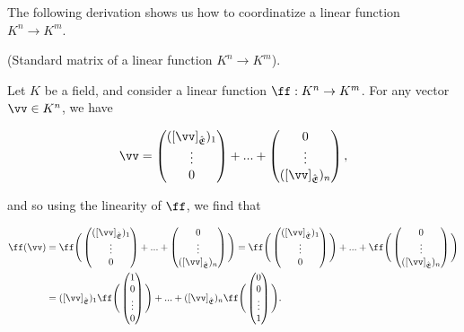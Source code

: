 The following derivation shows us how to coordinatize a linear function $K^n \rightarrow K^m$.

\begin{deriv}
\label{ch::lin_alg::deriv::standard_matrix}
    (Standard matrix of a linear function $K^n \rightarrow K^m$). 
    
    Let $K$ be a field, and consider a linear function $\ff:K^n \rightarrow K^m$. For any vector $\vv \in K^n$, we have 
    
    \begin{align*}
        \vv =
        \begin{pmatrix} ([\vv]_\sE)_1 \\ \vdots \\ 0 \end{pmatrix} + ... + \begin{pmatrix} 0 \\ \vdots \\ ([\vv]_\sE)_n \end{pmatrix},
    \end{align*}
    
    and so using the linearity of $\ff$, we find that
    
    \begin{align*}
        \ff(\vv) &= 
        \ff
        \Bigg(
            \begin{pmatrix} ([\vv]_\sE)_1 \\ \vdots \\ 0 \end{pmatrix} + ... + \begin{pmatrix} 0 \\ \vdots \\ ([\vv]_\sE)_n \end{pmatrix}
        \Bigg)
        =
        \ff \Bigg( 
        \begin{pmatrix} 
                ([\vv]_\sE)_1 \\ \vdots \\ 0 
        \end{pmatrix} \Bigg)
        +
        ...
        +
        \ff \Bigg(
        \begin{pmatrix} 
                0 \\ \vdots \\ ([\vv]_\sE)_n 
        \end{pmatrix} \Bigg) \\
        &=
        ([\vv]_\sE)_1
        \ff \Bigg(
        \begin{pmatrix} 
                1 \\ 0 \\ \vdots \\ 0 
        \end{pmatrix} \Bigg)
        +
        ...
        +
        ([\vv]_\sE)_n
        \ff \Bigg(
        \begin{pmatrix} 
                0 \\ 0 \\ \vdots \\ 1 
        \end{pmatrix} \Bigg).
    \end{align*}
    

\end{deriv}
